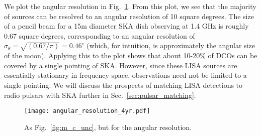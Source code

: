 We plot the angular resolution in Fig.~\ref{fig:ang_res}. From this plot, we see that the majority of sources can be resolved to an angular resolution of 10 square degrees. The size of a pencil beam for a 15m diameter SKA dish observing at 1.4 GHz is roughly 0.67 square degrees, corresponding to an angular resolution of $\sigma_\theta = \sqrt{(0.67 / \pi)} = 0.46^\circ$ (which, for intuition, is approximately the angular size of the moon). Applying this to the plot shows that about 10-20\% of DCOs can be covered by a single pointing of SKA. However, since these LISA sources are essentially stationary in frequency space, observations need not be limited to a single pointing. We will discuss the prospects of matching LISA detections to radio pulsars with SKA further in Sec.~\ref{sec:pulsar_matching}.

\begin{figure}[ht]
    \centering
    \texttt{[image: angular\_resolution\_4yr.pdf]}
    \caption{As Fig.~\ref{fig:m_c_unc}, but for the angular resolution.}
    \label{fig:ang_res}
\end{figure}
